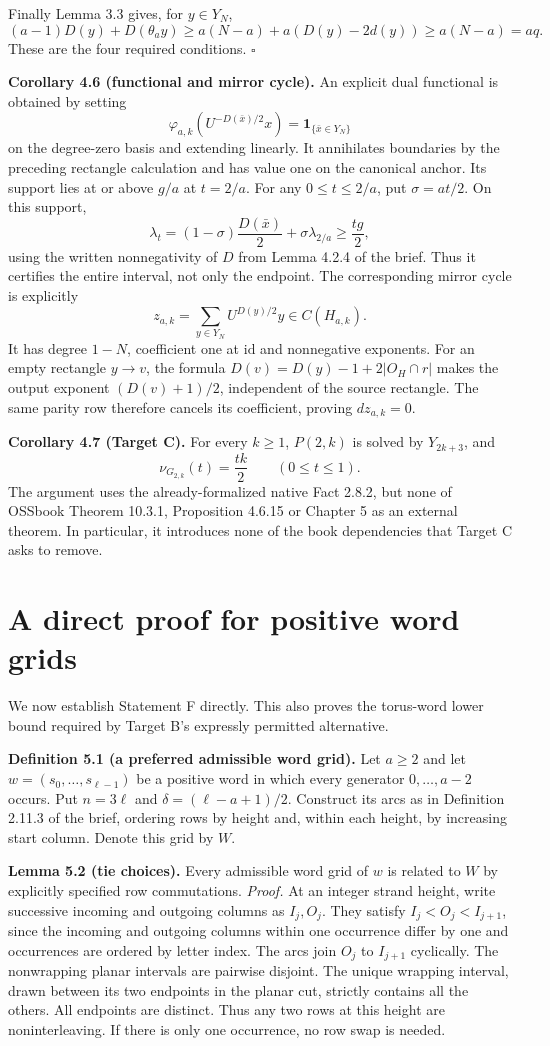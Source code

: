 \documentclass[11pt,a4paper]{article}
\begin{document}
Finally Lemma 3.3 gives, for $y\in Y_N$,
\[
(a-1)D(y)+D(\theta_a y)
\ge a(N-a)+a(D(y)-2d(y))\ge a(N-a)=aq.
\]
These are the four required conditions. $\square$

\textbf{Corollary 4.6 (functional and mirror cycle).}
An explicit dual functional is obtained by setting
\[
\varphi_{a,k}(U^{-D(\bar x)/2}x)=\mathbf1_{\{\bar x\in Y_N\}}
\]
on the degree-zero basis and extending linearly. It annihilates
boundaries by the preceding rectangle calculation and has value
one on the canonical anchor. Its support lies at or above $g/a$
at $t=2/a$. For any $0\le t\le2/a$, put $\sigma=at/2$. On this support,
\[
\lambda_t=(1-\sigma)\frac{D(\bar x)}{2}
+\sigma\lambda_{2/a}\ge\frac{tg}{2},
\]
using the written nonnegativity of $D$ from Lemma 4.2.4 of the brief.
Thus it certifies the entire interval, not only the endpoint.
The corresponding mirror cycle is explicitly
\[
z_{a,k}=\sum_{y\in Y_N}U^{D(y)/2}y\in C(H_{a,k}).
\]
It has degree $1-N$, coefficient one at $\mathrm{id}$ and nonnegative
exponents. For an empty rectangle $y\longrightarrow v$, the formula
$D(v)=D(y)-1+2|O_H\cap r|$ makes the output exponent
$(D(v)+1)/2$, independent of the source rectangle. The same parity
row therefore cancels its coefficient, proving $dz_{a,k}=0$.

\textbf{Corollary 4.7 (Target C).}
For every $k\ge1$, $P(2,k)$ is solved by $Y_{2k+3}$, and
\[
\nu_{G_{2,k}}(t)=\frac{tk}{2}\qquad(0\le t\le1).
\]
The argument uses the already-formalized native Fact 2.8.2, but none
of OSSbook Theorem 10.3.1, Proposition 4.6.15 or Chapter 5 as an
external theorem. In particular, it introduces none of the book
dependencies that Target C asks to remove.

\section{A direct proof for positive word grids}

We now establish Statement F directly. This also proves the
torus-word lower bound required by Target B's expressly permitted
alternative.

\textbf{Definition 5.1 (a preferred admissible word grid).}
Let $a\ge2$ and let $w=(s_0,\ldots,s_{\ell-1})$ be a positive word
in which every generator $0,\ldots,a-2$ occurs. Put $n=3\ell$ and
$\delta=(\ell-a+1)/2$. Construct its arcs as in Definition 2.11.3
of the brief, ordering rows by height and, within each height, by
increasing start column. Denote this grid by $W$.

\textbf{Lemma 5.2 (tie choices).}
Every admissible word grid of $w$ is related to $W$ by explicitly
specified row commutations.
\textit{Proof.}
At an integer strand height, write successive incoming and outgoing
columns as $I_j,O_j$. They satisfy
$I_j<O_j<I_{j+1}$, since the incoming and outgoing columns within
one occurrence differ by one and occurrences are ordered by letter
index. The arcs join $O_j$ to $I_{j+1}$ cyclically. The nonwrapping
planar intervals are pairwise disjoint. The unique wrapping
interval, drawn between its two endpoints in the planar cut,
strictly contains all the others. All endpoints are distinct.
Thus any two rows at this height are noninterleaving. If there is
only one occurrence, no row swap is needed.
\end{document}
